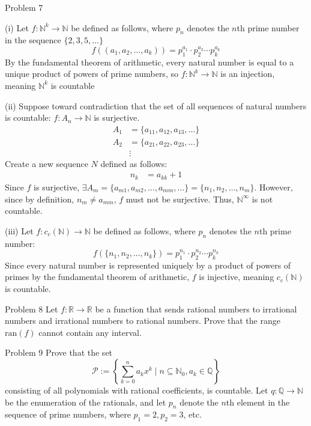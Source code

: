 \documentclass[10pt]{extarticle}
\begin{document}
{\begin{problem}{Problem 7}
\begin{problem}{(i)}
      Let $f: \mathbb{N}^k \rightarrow \mathbb{N}$ be defined as follows, where $p_n$ denotes the $n$th prime number in the sequence $\{2,3,5,\dots\}$
      \[
        f((a_1,a_2,\dots,a_k)) = p_1^{a_1}\cdot p_2^{a_2}\cdots p_k^{a_k}
      \] 
      By the fundamental theorem of arithmetic, every natural number is equal to a unique product of powers of prime numbers, so $f: \mathbb{N}^k \rightarrow \mathbb{N}$ is an injection, meaning $\mathbb{N}^k$ is countable
    \end{problem}
    \begin{problem}{(ii)}
      Suppose toward contradiction that the set of all sequences of natural numbers is countable: $f:A_n \rightarrow \mathbb{N}$ is surjective.
      \begin{align*}
        A_1 &= \{a_{11},a_{12},a_{13},\dots\}\\
        A_2 &= \{a_{21},a_{22},a_{23},\dots\}\\
            &\vdots
      \end{align*}
      Create a new sequence $N$ defined as follows:
      \begin{align*}
        n_{k} &= a_{kk} + 1
      \end{align*}
      Since $f$ is surjective, $\exists A_m = \{a_{m1},a_{m2},\dots,a_{mm},\dots\} = \{n_{1},n_{2},\dots,n_{m}\}$. However, since by definition, $n_m \neq a_{mm}$, $f$ must not be surjective. Thus, $\mathbb{N}^{\infty}$ is not countable.
    \end{problem}
    \begin{problem}{(iii)}
      Let $f: c_c(\mathbb{N}) \rightarrow \mathbb{N}$ be defined as follows, where $p_n$ denotes the $n$th prime number:
      \[
        f(\{n_1,n_2,\dots,n_k\}) = p_1^{n_1}\cdot p_2^{n_2}\cdots p_{k}^{n_k}
      \] 
      Since every natural number is represented uniquely by a product of powers of primes by the fundamental theorem of arithmetic, $f$ is injective, meaning $c_c(\mathbb{N})$ is countable.
    \end{problem}
  \end{problem}
  \begin{problem}{Problem 8}
    Let $f:\mathbb{R} \rightarrow \mathbb{R}$ be a function that sends rational numbers to irrational numbers and irrational numbers to rational numbers. Prove that the range $\textrm{ran}(f)$ cannot contain any interval.
  \end{problem}
  \begin{problem}{Problem 9}
    Prove that the set
    \[
      \mathcal{P} := \left\{\sum_{k=0}^{n}a_kx^k \mid n\subseteq \mathbb{N}_0,a_k\in\mathbb{Q}\right\}
    \] 
    consisting of all polynomials with rational coefficients, is countable.
    \tcblower
    Let $q: \mathbb{Q} \rightarrow \mathbb{N}$ be the enumeration of the rationals, and let $p_n$ denote the $n$th element in the sequence of prime numbers, where $p_1 = 2, p_2 = 3$, etc.\\


\end{problem}}
\end{document}
